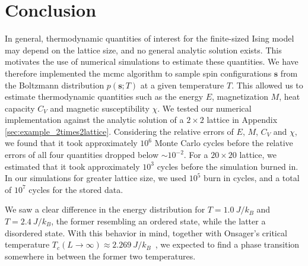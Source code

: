 \documentclass[english,notitlepage,reprint]{revtex4-2}  %
\renewcommand{\vec}[1]{\mathbf{#1}}
\begin{document}




\section{Conclusion}
In general, thermodynamic quantities of interest for the finite-sized Ising model may depend on the lattice size, and no general analytic solution exists. 
This motivates the use of numerical simulations to estimate these quantities.
We have therefore implemented the \gls{mcmc} algorithm to sample spin configurations \(\vec{s}\) from the Boltzmann distribution \(p(\vec{s}; T)\) at a given temperature \(T\).
This allowed us to estimate thermodynamic quantities such as the energy \(E\), magnetization \(M\), heat capacity \(C_V\) and magnetic susceptibility \(\chi\).
We tested our numerical implementation against the analytic solution of a \(2\times 2\) lattice in Appendix \ref{sec:example_2times2lattice}. 
Considering the relative errors of \(E\), \(M\), \(C_V\) and \(\chi\), we found that it took approximately \(10^6\) Monte Carlo cycles before the relative errors of all four quantities dropped below \(\sim 10^{-2}\). 
For a \(20\times 20\) lattice, we estimated that it took approximately \(10^3\) cycles before the simulation burned in. 
In our simulations for greater lattice size, we used \(10^5\) burn in cycles, and a total of \(10^7\) cycles for the stored data. 

We saw a clear difference in the energy distribution for \(T=1.0 \ \si{J/k_B}\) and \(T=2.4\ \si{J/k_B}\), the former resembling an ordered state, while the latter a disordered state. 
With this behavior in mind, together with Onsager's critical temperature \(T_c(L\rightarrow\infty)\approx 2.269\ \si{J/k_B}\)~\cite{LarsOnsager}, we expected to find a phase transition somewhere in between the former two temperatures. 
\end{document}
